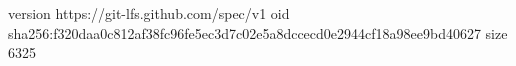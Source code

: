 version https://git-lfs.github.com/spec/v1
oid sha256:f320daa0c812af38fc96fe5ec3d7c02e5a8dccecd0e2944cf18a98ee9bd40627
size 6325
